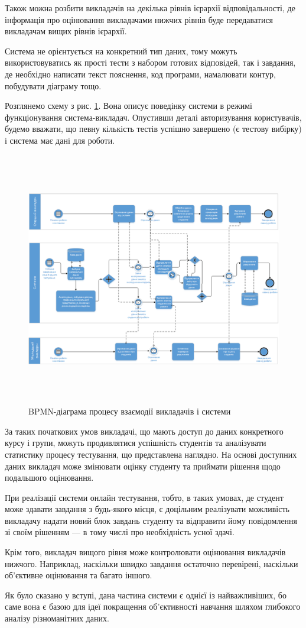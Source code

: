 Також можна розбити викладачів на декілька рівнів ієрархії відповідальності, де
інформація про оцінювання викладачами нижчих рівнів буде передаватися викладачам
вищих рівнів ієрархії.

Система не орієнтується на конкретний тип даних, тому можуть використовуватись
як прості тести з набором готових відповідей, так і завдання, де необхідно
написати текст пояснення, код програми, намалювати контур, побудувати діаграму
тощо.

Розглянемо схему з рис. \ref{fig:bpmn_teachers}.
Вона описує поведінку системи в режимі функціонування система-викладач.
Опустивши деталі авторизування користувачів, будемо вважати, що певну кількість
тестів успішно завершено (є тестову вибірку) і система має дані для роботи.

\begin{figure}[b!]
    \center\includegraphics[height=30em,angle=-90]{images/bpmn_teachers.png}
    \caption{BPMN-діаграма процесу взаємодії викладачів і системи}
    \label{fig:bpmn_teachers}
\end{figure}

За таких початкових умов викладачі, що мають доступ до даних конкретного
курсу і групи, можуть продивлятися успішність студентів та аналізувати
статистику процесу тестування, що представлена наглядно.
На основі доступних даних викладач може змінювати оцінку студенту та
приймати рішення щодо подальшого оцінювання.

При реалізації системи онлайн тестування, тобто, в таких умовах, де студент може
здавати завдання з будь-якого місця, є доцільним реалізувати можливість
викладачу надати новий блок завдань студенту та відправити йому
повідомлення зі своїм рішенням --- в тому числі про необхідність усної здачі.

Крім того, викладач вищого рівня може контролювати оцінювання викладачів
нижчого. Наприклад, наскільки швидко завдання остаточно перевірені, наскільки
об’єктивне оцінювання та багато іншого.

Як було сказано у вступі, дана частина системи є однієї із найважливіших, бо
саме вона є базою для ідеї покращення об’єктивності навчання шляхом глибокого
аналізу різноманітних даних.
